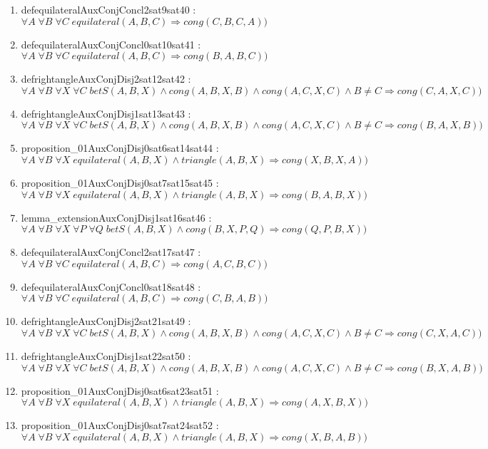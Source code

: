 \documentclass{article}
\begin{document}
\begin{enumerate}
\item defequilateralAuxConjConcl2sat9sat40 : $\forall A\;\forall B\;\forall C\;equilateral(A, B, C) \Rightarrow cong(C, B, C, A))$
\item defequilateralAuxConjConcl0sat10sat41 : $\forall A\;\forall B\;\forall C\;equilateral(A, B, C) \Rightarrow cong(B, A, B, C))$
\item defrightangleAuxConjDisj2sat12sat42 : $\forall A\;\forall B\;\forall X\;\forall C\;betS(A, B, X)\wedge cong(A, B, X, B)\wedge cong(A, C, X, C)\wedge B \neq C \Rightarrow cong(C, A, X, C))$
\item defrightangleAuxConjDisj1sat13sat43 : $\forall A\;\forall B\;\forall X\;\forall C\;betS(A, B, X)\wedge cong(A, B, X, B)\wedge cong(A, C, X, C)\wedge B \neq C \Rightarrow cong(B, A, X, B))$
\item proposition\_01AuxConjDisj0sat6sat14sat44 : $\forall A\;\forall B\;\forall X\;equilateral(A, B, X)\wedge triangle(A, B, X) \Rightarrow cong(X, B, X, A))$
\item proposition\_01AuxConjDisj0sat7sat15sat45 : $\forall A\;\forall B\;\forall X\;equilateral(A, B, X)\wedge triangle(A, B, X) \Rightarrow cong(B, A, B, X))$
\item lemma\_extensionAuxConjDisj1sat16sat46 : $\forall A\;\forall B\;\forall X\;\forall P\;\forall Q\;betS(A, B, X)\wedge cong(B, X, P, Q) \Rightarrow cong(Q, P, B, X))$
\item defequilateralAuxConjConcl2sat17sat47 : $\forall A\;\forall B\;\forall C\;equilateral(A, B, C) \Rightarrow cong(A, C, B, C))$
\item defequilateralAuxConjConcl0sat18sat48 : $\forall A\;\forall B\;\forall C\;equilateral(A, B, C) \Rightarrow cong(C, B, A, B))$
\item defrightangleAuxConjDisj2sat21sat49 : $\forall A\;\forall B\;\forall X\;\forall C\;betS(A, B, X)\wedge cong(A, B, X, B)\wedge cong(A, C, X, C)\wedge B \neq C \Rightarrow cong(C, X, A, C))$
\item defrightangleAuxConjDisj1sat22sat50 : $\forall A\;\forall B\;\forall X\;\forall C\;betS(A, B, X)\wedge cong(A, B, X, B)\wedge cong(A, C, X, C)\wedge B \neq C \Rightarrow cong(B, X, A, B))$
\item proposition\_01AuxConjDisj0sat6sat23sat51 : $\forall A\;\forall B\;\forall X\;equilateral(A, B, X)\wedge triangle(A, B, X) \Rightarrow cong(A, X, B, X))$
\item proposition\_01AuxConjDisj0sat7sat24sat52 : $\forall A\;\forall B\;\forall X\;equilateral(A, B, X)\wedge triangle(A, B, X) \Rightarrow cong(X, B, A, B))$

\end{enumerate}
\end{document}
